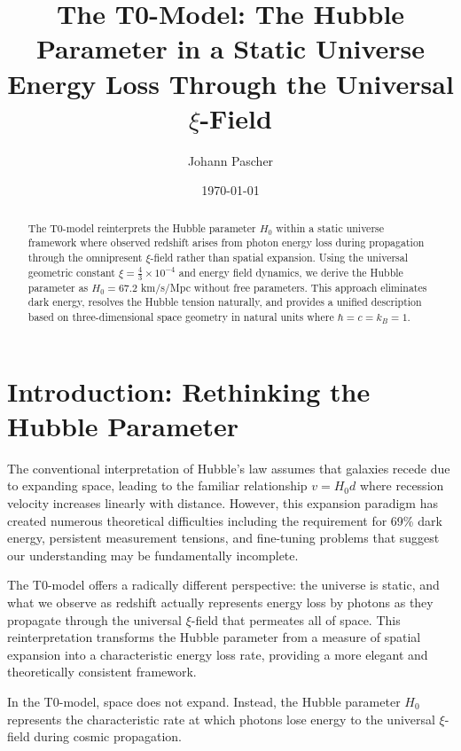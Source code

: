 \documentclass[12pt,a4paper]{article}
\begin{document}
	
	\title{The T0-Model: The Hubble Parameter in a Static Universe \\
		Energy Loss Through the Universal $\xi$-Field}
	\author{Johann Pascher}
	\date{\today}
	
	\maketitle
	
	\begin{abstract}
		The T0-model reinterprets the Hubble parameter $H_0$ within a static universe framework where observed redshift arises from photon energy loss during propagation through the omnipresent $\xi$-field rather than spatial expansion. Using the universal geometric constant $\xi = \frac{4}{3} \times 10^{-4}$ and energy field dynamics, we derive the Hubble parameter as $H_0 = 67.2$ km/s/Mpc without free parameters. This approach eliminates dark energy, resolves the Hubble tension naturally, and provides a unified description based on three-dimensional space geometry in natural units where $\hbar = c = k_B = 1$.
	\end{abstract}
	
	\tableofcontents
	\newpage
	
	\section{Introduction: Rethinking the Hubble Parameter}
	
	The conventional interpretation of Hubble's law assumes that galaxies recede due to expanding space, leading to the familiar relationship $v = H_0 d$ where recession velocity increases linearly with distance. However, this expansion paradigm has created numerous theoretical difficulties including the requirement for 69\% dark energy, persistent measurement tensions, and fine-tuning problems that suggest our understanding may be fundamentally incomplete.
	
	The T0-model offers a radically different perspective: the universe is static, and what we observe as redshift actually represents energy loss by photons as they propagate through the universal $\xi$-field that permeates all of space. This reinterpretation transforms the Hubble parameter from a measure of spatial expansion into a characteristic energy loss rate, providing a more elegant and theoretically consistent framework.
	
	\begin{revolutionary}
		In the T0-model, space does not expand. Instead, the Hubble parameter $H_0$ represents the characteristic rate at which photons lose energy to the universal $\xi$-field during cosmic propagation.
	\end{revolutionary}
	
\end{document}
